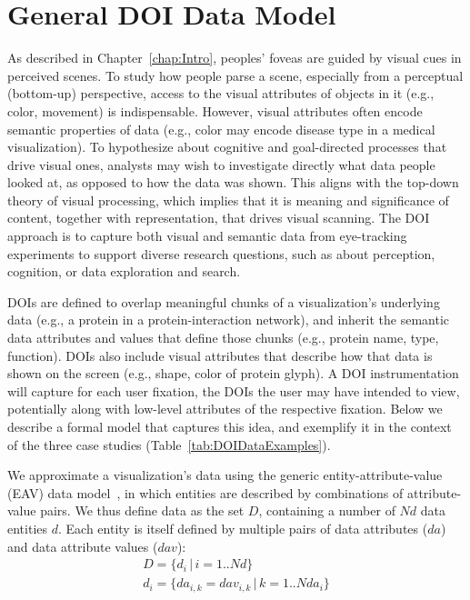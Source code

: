 \section{General DOI Data Model}
\label{sec:DOIDataModel}
As described in Chapter~\ref{chap:Intro}, peoples' foveas are guided by visual cues in perceived scenes. To study how people parse a scene, especially from a perceptual (bottom-up) perspective, access to the visual attributes of objects in it (e.g., color, movement) is indispensable. However, visual attributes often encode semantic properties of data (e.g., color may encode disease type in a medical visualization). To hypothesize about cognitive and goal-directed processes that drive visual ones, analysts may wish to investigate directly what data people looked at, as opposed to how the data was shown. This aligns with the top-down theory of visual processing, which implies that it is meaning and significance of content, together with representation, that drives visual scanning. The DOI approach is to capture both visual and semantic data from eye-tracking experiments to support diverse research questions, such as about perception, cognition, or data exploration and search. 

DOIs are defined to overlap meaningful chunks of a visualization's underlying data (e.g., a protein in a protein-interaction network), and inherit the semantic data attributes and values that define those chunks (e.g., protein name, type, function). DOIs also include visual attributes that describe how that data is shown on the screen (e.g., shape, color of protein glyph). A DOI instrumentation will capture for each user fixation, the DOIs the user may have intended to view, potentially along with low-level attributes of the respective fixation. Below we describe a formal model that captures this idea, and exemplify it in the context of the three case studies (Table~\ref{tab:DOIDataExamples}).

We approximate a visualization's data using the generic entity-attribute-value (EAV) data model~\cite{deran1991entity}, in which entities are described by combinations of attribute-value pairs.  We thus define data as the set $D$, containing a number of $N\!d$ data entities $d$. Each entity is itself defined by multiple pairs of data attributes ($da$) and data attribute values ($dav$):
\begin{equation*}
\begin{split} 
D = \{d_i \,|\, i=1..N\!d\} \\
d_{i} = \{da_{i,k} = dav_{i,k} \,|\, k=1..N\!da_{i}\}
\end{split}
\end{equation*}

